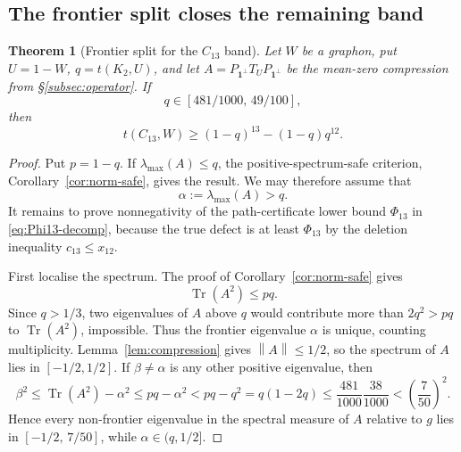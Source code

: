 \documentclass[11pt]{article}
\newtheorem{theorem}{Theorem}[section]
\newcommand{\one}{\mathbf 1}
\newcommand{\Tr}{\operatorname{Tr}}
\newcommand{\norm}[1]{\left\|#1\right\|}
\begin{document}
\subsection{The frontier split closes the remaining band}\label{subsec:C13-frontier}

\begin{theorem}[Frontier split for the $C_{13}$ band]\label{thm:C13-frontier}
Let $W$ be a graphon, put $U=1-W$, $q=t(K_2,U)$, and let $A=P_{\one^\perp}T_UP_{\one^\perp}$ be the mean-zero compression from \S\ref{subsec:operator}.  If
\[
        q\in[481/1000,\,49/100],
\]
then
\[
        t(C_{13},W)\ge (1-q)^{13}-(1-q)q^{12}.
\]
\end{theorem}

\begin{proof}
Put $p=1-q$.  If $\lambda_{\max}(A)\le q$, the positive-spectrum-safe criterion, Corollary~\ref{cor:norm-safe}, gives the result.  We may therefore assume that
\[
        \alpha:=\lambda_{\max}(A)>q.
\]
It remains to prove nonnegativity of the path-certificate lower bound $\Phi_{13}$ in \eqref{eq:Phi13-decomp}, because the true defect is at least $\Phi_{13}$ by the deletion inequality $c_{13}\le x_{12}$.

First localise the spectrum.  The proof of Corollary~\ref{cor:norm-safe} gives
\[
        \Tr(A^2)\le pq.
\]
Since $q>1/3$, two eigenvalues of $A$ above $q$ would contribute more than $2q^2>pq$ to $\Tr(A^2)$, impossible.  Thus the frontier eigenvalue $\alpha$ is unique, counting multiplicity.  Lemma~\ref{lem:compression} gives $\norm A\le1/2$, so the spectrum of $A$ lies in $[-1/2,1/2]$.  If $\beta\ne\alpha$ is any other positive eigenvalue, then
\[
        \beta^2\le\Tr(A^2)-\alpha^2
        \le pq-\alpha^2
        < pq-q^2=q(1-2q)
        \le \frac{481}{1000}\frac{38}{1000}
        < \left(\frac7{50}\right)^2.
\]
Hence every non-frontier eigenvalue in the spectral measure of $A$ relative to $g$ lies in $[-1/2,\,7/50]$, while $\alpha\in(q,1/2]$.


\end{proof}
\end{document}
